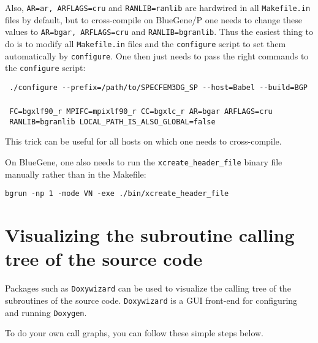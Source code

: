 \noindent Also, \texttt{AR=ar, ARFLAGS=cru} and \texttt{RANLIB=ranlib}
are hardwired in all \texttt{Makefile.in} files by default, but to
cross-compile on BlueGene/P one needs to change these values to \texttt{AR=bgar,
ARFLAGS=cru} and \texttt{RANLIB=bgranlib}. Thus the easiest thing
to do is to modify all \texttt{Makefile.in} files and the \texttt{configure}
script to set them automatically by \texttt{configure}. One then just
needs to pass the right commands to the \texttt{configure} script:

\noindent \texttt{ ./configure -{}-prefix=/path/to/SPECFEM3DG\_SP
-{}-host=Babel -{}-build=BGP }~\\
 \texttt{ FC=bgxlf90\_r MPIFC=mpixlf90\_r CC=bgxlc\_r AR=bgar ARFLAGS=cru
}~\\
 \texttt{ RANLIB=bgranlib LOCAL\_PATH\_IS\_ALSO\_GLOBAL=false}

\noindent This trick can be useful for all hosts on which one needs
to cross-compile.

\noindent On BlueGene, one also needs to run the \texttt{xcreate\_header\_file}
binary file manually rather than in the Makefile:

\noindent \texttt{bgrun -np 1 -mode VN -exe ./bin/xcreate\_header\_file}


\section{Visualizing the subroutine calling tree of the source code}

\noindent
Packages such as \texttt{Doxywizard} can be used to visualize the calling tree of the
subroutines of the  source code. \texttt{Doxywizard} is
a GUI front-end for configuring and running \texttt{Doxygen}.

\bigskip

\noindent To do your own call graphs, you can follow these simple steps below.

